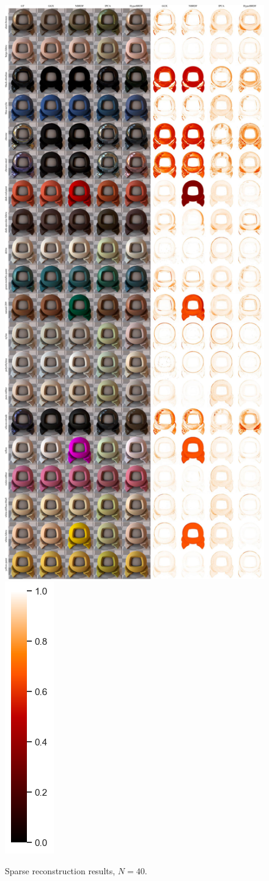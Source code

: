 \begin{figure}[ht]
  \centering

  {\includegraphics[width=0.65\linewidth]{Chapters/appendix-figs/supp_40-compressed.pdf}}
  {\includegraphics[width=0.02\linewidth]{Chapters/hyperbrdf-figs/vbar.png}}
   \caption{Sparse reconstruction results, $N = 40$.}
   \label{fig:40}
\end{figure}

